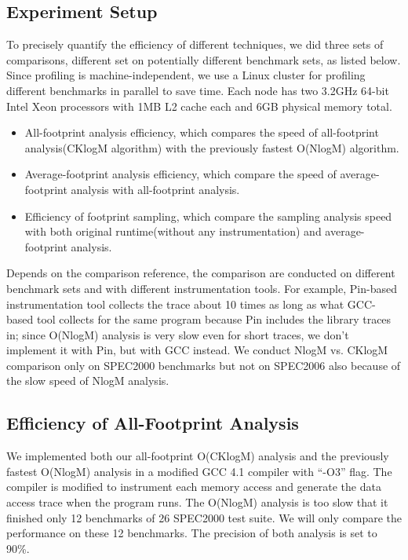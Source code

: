 \subsection{Experiment Setup}
\label{subsec:fp-eval-setup}
To precisely quantify the efficiency of different techniques, we did
three sets of comparisons, different set on potentially different
benchmark sets, as listed below. Since profiling is
machine-independent, we use a Linux cluster for profiling different
benchmarks in parallel to save time.  Each node has two 3.2GHz 64-bit
Intel Xeon processors with 1MB L2 cache each and 6GB physical memory total.

\begin{itemize}
\item All-footprint analysis efficiency, which compares the speed of
  all-footprint analysis(CKlogM algorithm) with the previously fastest
  O(NlogM) algorithm.
\item Average-footprint analysis efficiency, which compare the speed
  of average-footprint analysis with all-footprint analysis. 
\item Efficiency of footprint sampling, which compare the sampling
  analysis speed with both original runtime(without any
  instrumentation) and average-footprint analysis.
\end{itemize}

Depends on the comparison reference, the comparison are conducted on
different benchmark sets and with different instrumentation tools. For
example, Pin-based instrumentation tool collects the trace about 10
times as long as what GCC-based tool collects for the same program
because Pin includes the library traces in; since O(NlogM) analysis
is very slow even for short traces, we don't implement it with Pin, but
with GCC instead. We conduct NlogM vs. CKlogM comparison only on
SPEC2000 benchmarks but not on SPEC2006 also because of the slow speed
of NlogM analysis.

\subsection{Efficiency of All-Footprint Analysis}
\label{subsec:fp-eval-all-fp}

We implemented both our all-footprint
  O(CKlogM) analysis and the previously fastest O(NlogM) analysis in a
  modified GCC 4.1 compiler with ``-O3'' flag. The compiler is
  modified to instrument each memory access and generate the data
  access trace when the program runs. The O(NlogM) analysis is too slow that it
  finished only 12 benchmarks of 26 SPEC2000 test suite. We will only
  compare the performance on these 12 benchmarks. The precision of
  both analysis is set to 90\%. 

